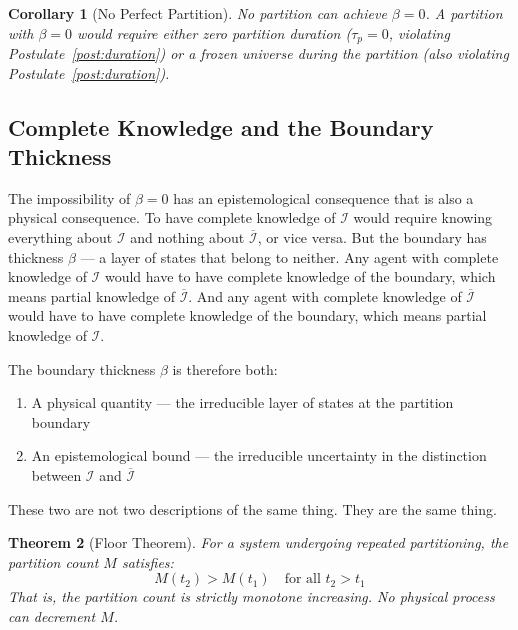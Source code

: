 \documentclass[11pt,twocolumn,a4paper]{article}
\theoremstyle{plain}
\newtheorem{theorem}{Theorem}[section]
\newtheorem{corollary}[theorem]{Corollary}
\theoremstyle{definition}
\theoremstyle{remark}
\begin{document}
\begin{corollary}[No Perfect Partition]
\label{cor:noperfect}
No partition can achieve $\beta = 0$. A partition with $\beta = 0$ would require
either zero partition duration ($\tau_p = 0$, violating
Postulate~\ref{post:duration}) or a frozen universe during the partition (also
violating Postulate~\ref{post:duration}).
\end{corollary}

\subsection{Complete Knowledge and the Boundary Thickness}
\label{subsec:knowledge}

The impossibility of $\beta = 0$ has an epistemological consequence that is
also a physical consequence. To have complete knowledge of $\mathcal{I}$ would
require knowing everything about $\mathcal{I}$ and nothing about
$\overline{\mathcal{I}}$, or vice versa. But the boundary has thickness $\beta$
--- a layer of states that belong to neither. Any agent with complete knowledge
of $\mathcal{I}$ would have to have complete knowledge of the boundary, which
means partial knowledge of $\overline{\mathcal{I}}$. And any agent with complete
knowledge of $\overline{\mathcal{I}}$ would have to have complete knowledge of
the boundary, which means partial knowledge of $\mathcal{I}$.

The boundary thickness $\beta$ is therefore both:
\begin{enumerate}
    \item A physical quantity --- the irreducible layer of states at the
          partition boundary
    \item An epistemological bound --- the irreducible uncertainty in the
          distinction between $\mathcal{I}$ and $\overline{\mathcal{I}}$
\end{enumerate}

These two are not two descriptions of the same thing. They are the same thing.

\begin{theorem}[Floor Theorem]
\label{thm:floor}
For a system undergoing repeated partitioning, the partition count $M$ satisfies:
\begin{equation}
    M(t_2) > M(t_1) \quad \text{for all } t_2 > t_1
    \label{eq:monotone}
\end{equation}
That is, the partition count is strictly monotone increasing. No physical process
can decrement $M$.
\end{theorem}
\end{document}
